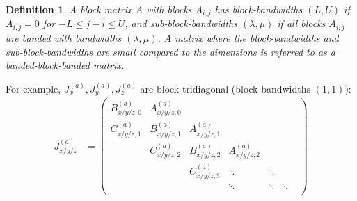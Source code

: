 \documentclass[11pt, oneside]{article}   	%
\newtheorem{definition}{Definition}
\begin{document}
\begin{definition}
A block matrix $A$ with blocks $A_{i,j}$ has block-bandwidths $(L,U)$ if $A_{i,j} = 0$ for $- L \leq j-i \leq U$, and sub-block-bandwidths $(\lambda, \mu)$ if all blocks $A_{i,j}$ are banded with bandwidths $(\lambda,\mu)$. A matrix where the block-bandwidths and sub-block-bandwidths are small compared to the dimensions is referred to as a banded-block-banded matrix. 
\end{definition}

For example, $J_x^{(a)}, J_y^{(a)}, J_z^{(a)}$ are block-tridiagonal (block-bandwidths $(1,1)$):
\begin{align*}
	J_{x/y/z}^{(a)} &= 
		\begin{pmatrix}
			B^{(a)}_{x/y/z, 0} & A^{(a)}_{x/y/z, 0} & & & & \\
			C^{(a)}_{x/y/z, 1} & B^{(a)}_{x/y/z, 1} & A^{(a)}_{x/y/z, 1} & & & \\
			& C^{(a)}_{x/y/z, 2} & B^{(a)}_{x/y/z, 2} & A^{(a)}_{x/y/z, 2} & & & \\
			& & C^{(a)}_{x/y/z, 3} & \ddots & \ddots & \\
			& & & \ddots & \ddots & \ddots \\
		\end{pmatrix}
\end{align*}
\end{document}
